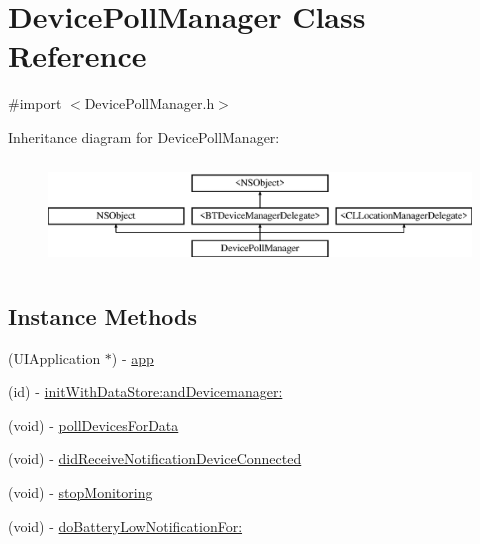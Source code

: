\hypertarget{interface_device_poll_manager}{\section{Device\-Poll\-Manager Class Reference}
\label{interface_device_poll_manager}
}


{\ttfamily \#import $<$Device\-Poll\-Manager.\-h$>$}

Inheritance diagram for Device\-Poll\-Manager\-:\begin{figure}[H]
\begin{center}
\leavevmode
\includegraphics[height=2.814070cm]{interface_device_poll_manager}
\end{center}
\end{figure}
\subsection*{Instance Methods}
\begin{DoxyCompactItemize}
\item 
(U\-I\-Application $\ast$) -\/ \hyperlink{interface_device_poll_manager_a896832635ddcf3d3d1f60cd856f0dd96}{app}
\item 
(id) -\/ \hyperlink{interface_device_poll_manager_ac1637206b4271575f8b2afd39375125b}{init\-With\-Data\-Store\-:and\-Devicemanager\-:}
\item 
(void) -\/ \hyperlink{interface_device_poll_manager_ac0c31de4251c9eac9b21594cc866f165}{poll\-Devices\-For\-Data}
\item 
(void) -\/ \hyperlink{interface_device_poll_manager_a91b7db2f338c98f0d653e8a33d95b736}{did\-Receive\-Notification\-Device\-Connected}
\item 
(void) -\/ \hyperlink{interface_device_poll_manager_a4fe6160b06d23999e8939c88e900b232}{stop\-Monitoring}
\item 
(void) -\/ \hyperlink{interface_device_poll_manager_aa0e15e54081df4d481de96cde113f2b8}{do\-Battery\-Low\-Notification\-For\-:}
\end{DoxyCompactItemize}
